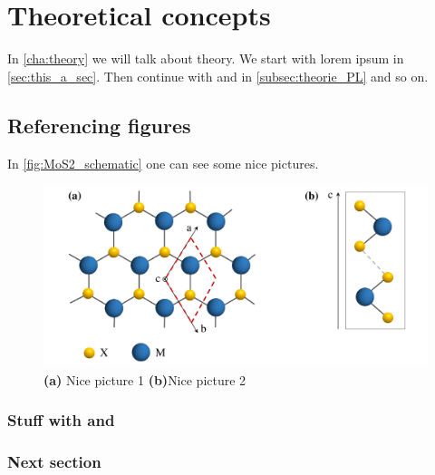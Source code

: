 \chapter{Theoretical concepts}\label{cha:theory}

In \autoref{cha:theory} we will talk about theory. We start with lorem ipsum in \autoref{sec:this_a_sec}. Then continue with \molyd and \wolyd in \autoref{subsec:theorie_PL} and so on.

\section{Referencing figures}\label{sec:this_a_sec}

In \autoref{fig:MoS2_schematic} one can see some nice pictures.


\unpacklipsum[2]\lipsumexp

\begin{figure}[t]
	\includegraphics[width=1\textwidth,keepaspectratio=true]{Images/MoS2_2.pdf}
	\caption[]{\textbf{(a)} Nice picture 1 \textbf{(b)}Nice picture 2}
	\label{fig:MoS2_schematic}
\end{figure}

\subsection{Stuff with \texorpdfstring{\moly}{MoS2} and \texorpdfstring{\woly}{WS2}}\label{subsec:theorie_PL} %

\unpacklipsum[1-1]{}\lipsumexp

\subsection{Next section}\label{sec:next_sec}

